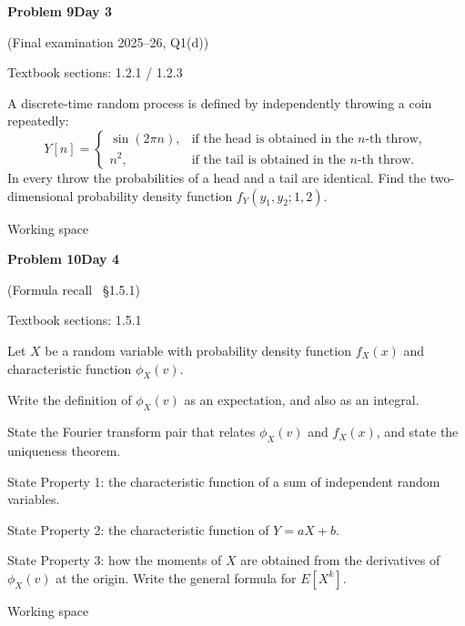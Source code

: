 \documentclass[11pt]{article}
\newcommand{\qtitle}[2]{\clearpage\begin{tcolorbox}[colback=navy,colframe=navy,arc=1.5pt,boxrule=0pt]\color{white}\large\bfseries #1\hfill\small #2\end{tcolorbox}}
\begin{document}
\qtitle{Problem 9}{Day 3}
{\small\color{accentred}(Final examination 2025--26, Q1(d))}\par\smallskip
{\small\color{muted}Textbook sections: 1.2.1 / 1.2.3}\par\medskip
\begin{tcolorbox}[colback=qbg,colframe=qbg,boxrule=0pt]A discrete-time random process is defined by independently throwing a coin repeatedly:
\[
Y[n]=
\begin{cases}
\sin(2\pi n), & \text{if the head is obtained in the } n\text{-th throw},\\[4pt]
n^{2}, & \text{if the tail is obtained in the } n\text{-th throw}.
\end{cases}
\]
In every throw the probabilities of a head and a tail are identical. Find the two-dimensional
probability density function $f_Y(y_1,y_2;1,2)$.\end{tcolorbox}\smallskip\begin{workspace}\hfill{\color{linec}\footnotesize Working space}\end{workspace}
\qtitle{Problem 10}{Day 4}
{\small\color{accentred}(Formula recall \textemdash\ \S1.5.1)}\par\smallskip
{\small\color{muted}Textbook sections: 1.5.1}\par\medskip
\begin{tcolorbox}[colback=qbg,colframe=qbg,boxrule=0pt]Let $X$ be a random variable with probability density function $f_X(x)$ and characteristic
function $\phi_X(v)$.
\begin{qparts}
  \item Write the definition of $\phi_X(v)$ as an expectation, and also as an integral.
  \item State the Fourier transform pair that relates $\phi_X(v)$ and $f_X(x)$, and state the
        uniqueness theorem.
  \item State Property 1: the characteristic function of a sum of independent random variables.
  \item State Property 2: the characteristic function of $Y=aX+b$.
  \item State Property 3: how the moments of $X$ are obtained from the derivatives of
        $\phi_X(v)$ at the origin. Write the general formula for $E[X^{k}]$.
\end{qparts}\end{tcolorbox}\smallskip\begin{workspace}\hfill{\color{linec}\footnotesize Working space}\end{workspace}
\end{document}

